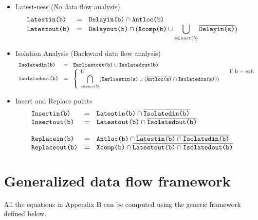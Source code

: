 \begin{itemize}
\item Latest-ness (No data flow analysis)
\begin{equation}
\begin{array}{l c l}
\texttt{Latestin(b)}  &=& \texttt{Delayin(b)} \cap \texttt{Antloc(b)}\\
\texttt{Latestout(b)} &=& \texttt{Delayout(b)} \cap (\texttt{Xcomp(b)} \cup \displaystyle \bigcup_{s \in succ(b)} \overline{\texttt{Delayin(s)}})
\end{array}
\end{equation}


\item Isolation Analysis (Backward data flow analysis)
\begin{equation}
\begin{array}{l c l}
\texttt{Isolatedin(b)} &=& \texttt{Earliestout(b)} \cup \texttt{Isolatedout(b)} \\
\texttt{Isolatedout(b)} &=& \left\{
                    \begin{array}{l l}
                        U & \quad \text{if b = exit}\\
                        \displaystyle \bigcap_{s \in succ(b)} (\texttt{Earliestin(s)} \cup (\overline{\texttt{Antloc(s)}} \cap \texttt{Isolatedin(s)}) )&
                    \end{array} \right. \\
\end{array}
\end{equation}

\item Insert and Replace points
\begin{equation}
\begin{array}{l c l}
\texttt{Insertin(b)} &=& \texttt{Latestin(b)} \cap \overline{\texttt{Isolatedin(b)}} \\
\texttt{Insertout(b)} &=& \texttt{Latestout(b)} \cap \overline{\texttt{Isolatedout(b)}} \\
&&\\
\texttt{Replacein(b)} &=& \texttt{Antloc(b)} \cap \overline{\texttt{Latestin(b)} \cap \texttt{Isolatedin(b)}} \\
\texttt{Replaceout(b)} &=& \texttt{Xcomp(b)} \cap \overline{\texttt{Latestout(b)} \cap \texttt{Isolatedout(b)}}
\end{array}
\end{equation}
\end{itemize}

\chapter{Generalized data flow framework}

All the equations in Appendix B can be computed using the generic
framework defined below.

